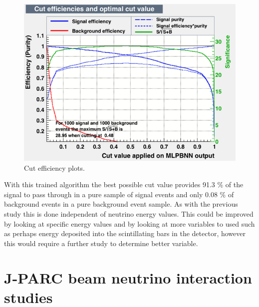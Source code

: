 \begin{figure}[h!]
\centering

\includegraphics[width=\textwidth]{figures/neutrinoTMVA/mvaeffs_MLPBNN.png}
\caption{Cut efficiency plots.}
\label{fig:TMVANeucuts}
\end{figure}


With this trained algorithm the best possible cut value provides 91.3 \% of the signal to pass through in a pure sample of signal events and only 0.08 \% of background events in a pure background event sample. As with the previous study this is done independent of neutrino energy values. This could be improved by looking at specific energy values and by looking at more variables to used such as perhaps energy deposited into the scintillating bars in the detector, however this would require a further study to determine better variable.




\pagebreak

\chapter{J-PARC beam neutrino interaction studies}
\label{c:neutrinoT2K}


